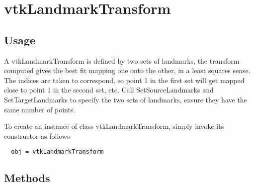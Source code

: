 \section{vtkLandmarkTransform}

\subsection{Usage}

 A vtkLandmarkTransform is defined by two sets of landmarks, the 
 transform computed gives the best fit mapping one onto the other, in a 
 least squares sense. The indices are taken to correspond, so point 1 
 in the first set will get mapped close to point 1 in the second set, 
 etc. Call SetSourceLandmarks and SetTargetLandmarks to specify the two
 sets of landmarks, ensure they have the same number of points.

To create an instance of class vtkLandmarkTransform, simply
invoke its constructor as follows
\begin{verbatim}
  obj = vtkLandmarkTransform
\end{verbatim}
\subsection{Methods}

